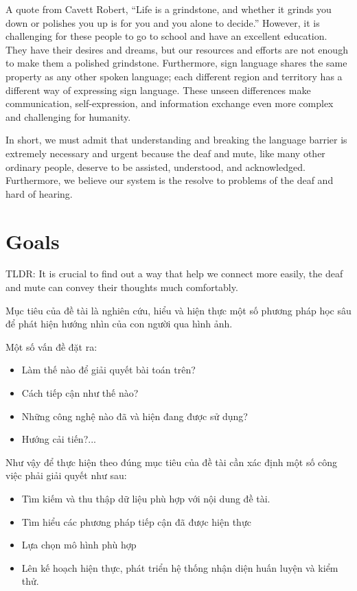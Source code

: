 A quote from Cavett Robert, “Life is a grindstone, and whether it grinds you down or polishes you up is for you and you alone to decide.” However, it is challenging for these people to go to school and have an excellent education. They have their desires and dreams, but our resources and efforts are not enough to make them a polished grindstone. Furthermore, sign language shares the same property as any other spoken language; each different region and territory has a different way of expressing sign language. These unseen differences make communication, self-expression, and information exchange even more complex and challenging for humanity.

In short, we must admit that understanding and breaking the language barrier is extremely necessary and urgent because the deaf and mute, like many other ordinary people, deserve to be assisted, understood, and acknowledged. Furthermore, we believe our system is the resolve to problems of the deaf and hard of hearing.

\section{Goals}


TLDR: It is crucial to find out a way that help we connect more easily, the deaf and mute can convey their thoughts much comfortably.

Mục tiêu của đề tài là nghiên cứu, hiểu và hiện thực một số phương pháp học sâu để phát hiện hướng nhìn của con người qua hình ảnh.

Một số vấn đề đặt ra: 
\begin{itemize}
  \item Làm thế nào để giải quyết bài toán trên?
  \item Cách tiếp cận như thế nào?
  \item Những công nghệ nào đã và hiện đang được sử dụng?
  \item Hướng cải tiến?...
\end{itemize}

Như vậy để thực hiện theo đúng mục tiêu của đề tài cần xác định một số công việc phải giải quyết như sau:
\begin{itemize}
  \item Tìm kiếm và thu thập dữ liệu phù hợp với nội dung đề tài.
  \item Tìm hiểu các phương pháp tiếp cận đã được hiện thực
  \item Lựa chọn mô hình phù hợp
  \item Lên kế hoạch hiện thực, phát triển hệ thống nhận diện huấn luyện và kiểm thử.
\end{itemize}

